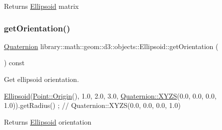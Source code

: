 \begin{DoxyReturn}{Returns}
\hyperlink{classlibrary_1_1math_1_1geom_1_1d3_1_1objects_1_1_ellipsoid}{Ellipsoid} matrix 
\end{DoxyReturn}
\mbox{\label{classlibrary_1_1math_1_1geom_1_1d3_1_1objects_1_1_ellipsoid_a8d426da587827eff577de4edb58ae417}} 
\subsubsection{\texorpdfstring{get\+Orientation()}{getOrientation()}}
{\footnotesize\ttfamily \hyperlink{classlibrary_1_1math_1_1geom_1_1trf_1_1rot_1_1_quaternion}{Quaternion} library\+::math\+::geom\+::d3\+::objects\+::\+Ellipsoid\+::get\+Orientation (\begin{DoxyParamCaption}{ }\end{DoxyParamCaption}) const}



Get ellipsoid orientation. 


\begin{DoxyCode}
\hyperlink{classlibrary_1_1math_1_1geom_1_1d3_1_1objects_1_1_ellipsoid_aae81fe0edc7f0e8d4590ea89ae73cb14}{Ellipsoid}(\hyperlink{classlibrary_1_1math_1_1geom_1_1d3_1_1objects_1_1_point_ab2a38e285c562e50bf350272c083986f}{Point::Origin}(), 1.0, 2.0, 3.0, \hyperlink{classlibrary_1_1math_1_1geom_1_1trf_1_1rot_1_1_quaternion_afff9523c7dcbfbbc521736121e62ad41}{Quaternion::XYZS}(0.0, 0.0, 
      0.0, 1.0)).getRadius() ; \textcolor{comment}{// Quaternion::XYZS(0.0, 0.0, 0.0, 1.0)}
\end{DoxyCode}


\begin{DoxyReturn}{Returns}
\hyperlink{classlibrary_1_1math_1_1geom_1_1d3_1_1objects_1_1_ellipsoid}{Ellipsoid} orientation 
\end{DoxyReturn}
\mbox{\label{classlibrary_1_1math_1_1geom_1_1d3_1_1objects_1_1_ellipsoid_a33dde96894c213da77ee116ff18fdf86}} 

